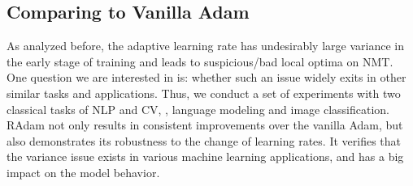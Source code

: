 \vspace{-0.1cm}
\subsection{Comparing to Vanilla Adam}
\vspace{-0.1cm}
As analyzed before, the adaptive learning rate has undesirably large variance in the early stage of training and leads to suspicious/bad local optima on NMT. 
One question we are interested in is: whether such an issue widely exits in other similar tasks and applications.
Thus, we conduct a set of experiments with two classical tasks of NLP and CV, \ie, language modeling and image classification.
RAdam not only results in consistent improvements over the vanilla Adam, but also demonstrates its robustness to the change of learning rates. 
It verifies that the variance issue exists in various machine learning applications, and has a big impact on the model behavior. 




